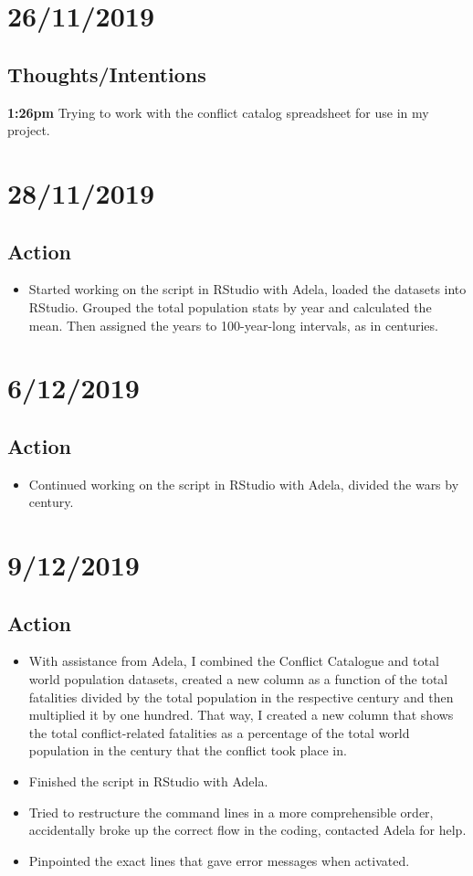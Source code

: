 \documentclass{article}
\begin{document}
\section{26/11/2019}
\subsection{Thoughts/Intentions}

\textbf{1:26pm} Trying to work with the conflict catalog spreadsheet for use in my project.

\section{28/11/2019}
\subsection{Action}
\begin{itemize}
    \item Started working on the script in RStudio with Adela, loaded the datasets into RStudio. Grouped the total population stats by year and calculated the mean. Then assigned the years to 100-year-long intervals, as in centuries.
\end{itemize}

\section{6/12/2019}
\subsection{Action}
\begin{itemize}
    \item Continued working on the script in RStudio with Adela, divided the wars by century.
\end{itemize}

\section{9/12/2019}
\subsection{Action}
\begin{itemize}
    \item With assistance from Adela, I combined the Conflict Catalogue and total world population datasets, created a new column as a function of the total fatalities divided by the total population in the respective century and then multiplied it by one hundred. That way, I created a new column that shows the total conflict-related fatalities as a percentage of the total world population in the century that the conflict took place in.
    \item Finished the script in RStudio with Adela.
    \item Tried to restructure the command lines in a more comprehensible order, accidentally broke up the correct flow in the coding, contacted Adela for help.
    \item Pinpointed the exact lines that gave error messages when activated.
\end{itemize}
\end{document}
